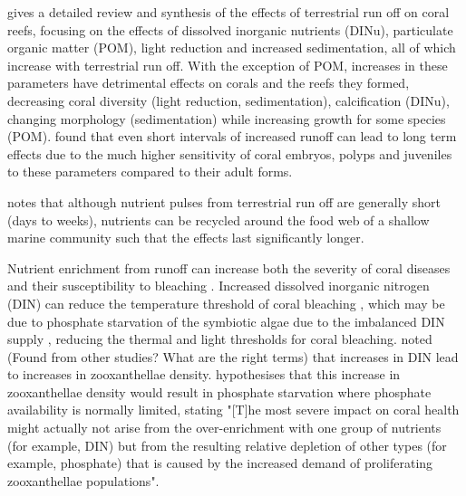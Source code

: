 \documentclass[11pt,a4paper]{article}
\begin{document}
\cite{Fabricius2005} gives a detailed review and synthesis of the effects of terrestrial run off on coral reefs, focusing on the effects of dissolved inorganic nutrients (DINu), particulate organic matter (POM), light reduction and increased sedimentation, all of which increase with terrestrial run off. With the exception of POM, increases in these parameters have detrimental effects on corals and the reefs they formed, decreasing coral diversity (light reduction, sedimentation), calcification (DINu), changing morphology (sedimentation) while increasing growth for some species (POM).
 \cite{Fabricius2005} found that even short intervals of increased runoff can lead to long term effects due to the much higher sensitivity of coral embryos, polyps and juveniles to these parameters compared to their adult forms. 

\cite{Wooldridge2009} notes that although nutrient pulses from terrestrial run off are generally short (days to weeks), nutrients can be recycled around the food web of a shallow marine community such that the effects last significantly longer.


Nutrient enrichment from runoff can increase both the severity of coral diseases \citep{Bruno2003} and their susceptibility to bleaching \citep{Wiedenmann2013}.
 Increased dissolved inorganic nitrogen (DIN) can reduce the temperature threshold of coral bleaching  \citep{Wooldridge2009}, which may be due to phosphate starvation of the symbiotic algae due to the imbalanced DIN supply \citep{Wiedenmann2013}, reducing the thermal and light thresholds for coral bleaching.
 \cite{Fabricius2005} noted (Found from other studies? What are the right terms) that increases in DIN lead to increases in zooxanthellae density.
 \cite{Wiedemann2013} hypothesises that this increase in zooxanthellae density would result in phosphate starvation where phosphate availability is normally limited, stating "[T]he most severe impact on coral health might actually not arise from the over-enrichment with one group of nutrients (for example, DIN) but from the resulting relative depletion of other types (for example, phosphate) that is caused by the increased demand of proliferating zooxanthellae populations".
\end{document}
